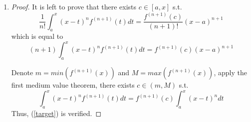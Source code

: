 \documentclass[paper=a4, fontsize=11pt]{scrartcl} %
\numberwithin{equation}{section} %
\numberwithin{figure}{section} %
\numberwithin{table}{section} %
\begin{document}
\begin{enumerate}
		\item 
			\begin{proof}
				It is left to prove that there exists $c\in [a, x]$ s.t. 
				\begin{equation}
					\frac{1}{n!}\int_{a}^{x} (x-t)^{n} f^{(n+1)}(t) dt = \frac{f^{(n+1)}(c)}{(n+1)!}(x-a)^{n+1}
				\end{equation}
				which is equal to 
				\begin{equation}
					(n+1)\int_{a}^{x} (x-t)^{n} f^{(n+1)}(t) dt = f^{(n+1)}(c)(x-a)^{n+1} \label{target}
				\end{equation}
				
				Denote $m = min(f^{(n+1)}(x))$ and $ M = max(f^{(n+1)}(x))$, apply the first medium value theorem, there exists $c \in (m, M)$ s.t. 
				\begin{equation}
					\int_{a}^{x} (x-t)^{n} f^{(n+1)}(t) dt = f^{(n+1)}(c) \int_{a}^{x} (x-t)^{n} dt
				\end{equation}
				Thus, (\ref{target}) is verified.
			\end{proof}
		
	\end{enumerate}


\end{document}
